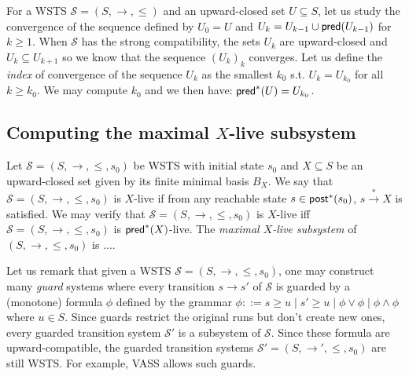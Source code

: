 


For a WSTS $\mathscr{S}=(S, \rightarrow, \leq)$ and an upward-closed set $U  \subseteq S$, let us study the convergence of the sequence defined by $U_0=U$ and $U_k= U_{k-1} \cup \textsf{pred}(U_{k-1})$ for $k \geq 1$. When $\mathscr{S}$ has the strong compatibility, the sets $U_k$ are upward-closed and $U_k \subseteq U_{k+1}$ so we know that the sequence $(U_k)_k$ converges. Let us define the \emph{index} of convergence of the sequence $U_k$ as the smallest $k_0$ s.t. $U_k = U_{k_0}$ for all $k \geq k_0$. We may compute $k_0$ and we then have:  $\textsf{pred}^*(U) = U_{k_0}$. \\
%

\noindent
\subsection{Computing the maximal $X$-live subsystem}

Let $\mathscr{S}=(S, \rightarrow, \leq,s_0)$ be WSTS with initial state $s_0$ and $X \subseteq S$ be an upward-closed set given by its finite minimal basis $B_X$. We say that $\mathscr{S}=(S, \rightarrow, \leq,s_0)$ is $X$-live if from any reachable state $s \in \textsf{post}^*(s_0)$, $s \xrightarrow{*} X$ is satisfied.  We may verify that  $\mathscr{S}=(S, \rightarrow, \leq,s_0)$ is $X$-live iff  $\mathscr{S}=(S, \rightarrow, \leq,s_0)$ is $\textsf{pred}^*(X)$-live. The \emph{maximal $X$-live subsystem} of $(S,\rightarrow,\leq,s_0)$ is ....

Let us remark that given a WSTS $\mathscr{S}=(S, \rightarrow, \leq,s_0)$, one may construct many \emph{guard} systems where every transition $s \rightarrow s'$ of $\mathscr{S}$ is guarded by a (monotone) formula $\phi$ defined by the grammar $\phi ::= s \geq u \mid s' \geq u \mid \phi \vee \phi \mid \phi \wedge \phi$ where $u \in S$. Since guards restrict the original runs but don't create new ones, every guarded transition system $\mathscr{S'}$ is a subsystem of $\mathscr{S}$. Since these formula are upward-compatible, the guarded transition systems $\mathscr{S'}=(S, \rightarrow', \leq,s_0)$ are still WSTS.
%
For example, VASS allows such guards.

